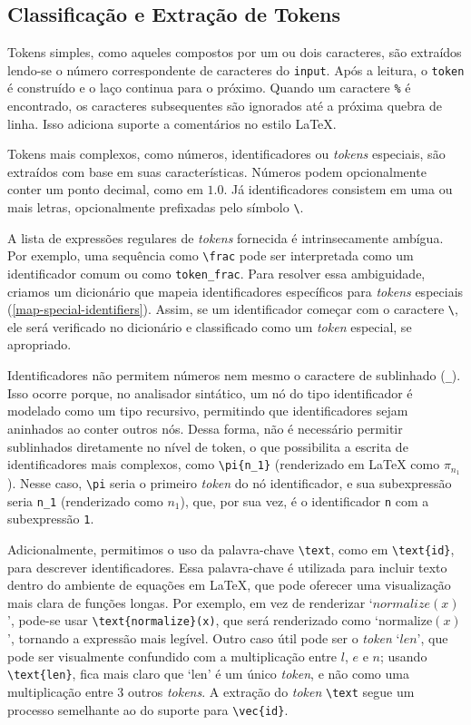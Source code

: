 \subsection{Classificação e Extração de Tokens}

Tokens simples, como aqueles compostos por um ou dois caracteres, são extraídos lendo-se o número correspondente de caracteres do \texttt{input}. Após a leitura, o \texttt{token} é construído e o laço continua para o próximo. Quando um caractere \texttt{\%} é encontrado, os caracteres subsequentes são ignorados até a próxima quebra de linha. Isso adiciona suporte a comentários no estilo \LaTeX{}.

Tokens mais complexos, como números, identificadores ou \textit{tokens} especiais, são extraídos com base em suas características. Números podem opcionalmente conter um ponto decimal, como em $1.0$. Já identificadores consistem em uma ou mais letras, opcionalmente prefixadas pelo símbolo \verb|\|.

A lista de expressões regulares de \textit{tokens} fornecida é intrinsecamente ambígua. Por exemplo, uma sequência como \verb|\frac| pode ser interpretada como um identificador comum ou como \verb"token_frac". Para resolver essa ambiguidade, criamos um dicionário que mapeia identificadores específicos para \textit{tokens} especiais (\autoref{map-special-identifiers}). Assim, se um identificador começar com o caractere \verb|\|, ele será verificado no dicionário e classificado como um \textit{token} especial, se apropriado.


\label{lexer-subexpression}
Identificadores não permitem números nem mesmo o caractere de sublinhado (\verb|_|). Isso ocorre porque, no analisador sintático, um nó do tipo identificador é modelado como um tipo recursivo, permitindo que identificadores sejam aninhados ao conter outros nós. Dessa forma, não é necessário permitir sublinhados diretamente no nível de token, o que possibilita a escrita de identificadores mais complexos, como \verb|\pi{n_1}| (renderizado em \LaTeX{} como $\pi_{n_1}$). Nesse caso, \verb|\pi| seria o primeiro \textit{token} do nó identificador, e sua subexpressão seria \verb|n_1| (renderizado como $n_1$), que, por sua vez, é o identificador \verb|n| com a subexpressão \verb|1|.


Adicionalmente, permitimos o uso da palavra-chave \verb|\text|, como em \verb|\text{id}|, para descrever identificadores. Essa palavra-chave é utilizada para incluir texto dentro do ambiente de equações em \LaTeX{}, que pode oferecer uma visualização mais clara de funções longas. Por exemplo, em vez de renderizar `\( normalize(x) \)', pode-se usar \verb|\text{normalize}(x)|, que será renderizado como `\( \text{normalize}(x) \)', tornando a expressão mais legível. Outro caso útil pode ser o \textit{token} `\( len \)', que pode ser visualmente confundido com a multiplicação entre \(l\), \(e\) e \(n\); usando \verb|\text{len}|, fica mais claro que `\(\text{len}\)' é um único \textit{token}, e não como uma multiplicação entre 3 outros \textit{tokens}. A extração do \textit{token} \verb|\text| segue um processo semelhante ao do suporte para \verb|\vec{id}|.

